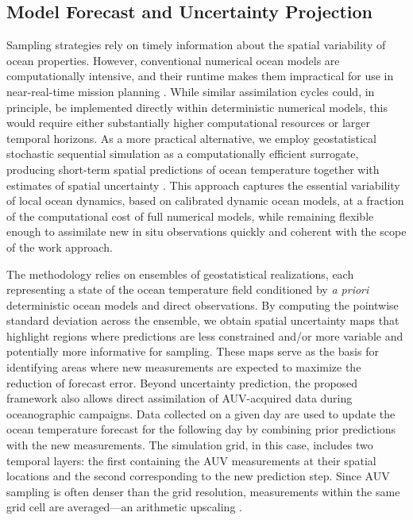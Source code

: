 \subsection{Model Forecast and Uncertainty Projection}

Sampling strategies rely on timely information about the spatial
variability of ocean properties. However, conventional numerical ocean
models are computationally intensive, and their runtime makes them
impractical for use in near-real-time mission planning . While similar assimilation cycles could, in
principle, be implemented directly within deterministic numerical
models, this would require either substantially higher computational
resources or larger temporal horizons. As a more practical
alternative, we employ geostatistical stochastic sequential simulation
as a computationally efficient surrogate, producing short-term spatial
predictions of ocean temperature together with estimates of spatial
uncertainty \cite{deutsch1992}. This approach captures the essential
variability of local ocean dynamics, based on calibrated dynamic ocean
models, at a fraction of the computational cost of full numerical
models, while remaining flexible enough to assimilate new in situ
observations quickly \cite{Duarte2025} and coherent with the scope of
the work approach. 

The methodology relies on ensembles of geostatistical realizations,
each representing a state of the ocean temperature field conditioned
by \emph{a priori} deterministic ocean models \cite{CMEMS2017} and
direct observations. By computing the pointwise standard deviation
across the ensemble, we obtain spatial uncertainty maps that highlight
regions where predictions are less constrained and/or more variable
and potentially more informative for sampling. These maps serve as the
basis for identifying areas where new measurements are expected to
maximize the reduction of forecast error. 
Beyond uncertainty prediction, the proposed framework also allows direct assimilation of AUV-acquired data during oceanographic campaigns. Data collected on a given day are used to update the ocean temperature forecast for the following day by combining prior predictions with the new measurements. The simulation grid, in this case, includes two temporal layers: the first containing the AUV measurements at their spatial locations and the second corresponding to the new prediction step. Since AUV sampling is often denser than the grid resolution, measurements within the same grid cell are averaged—an arithmetic upscaling \cite{duarte2025}.


